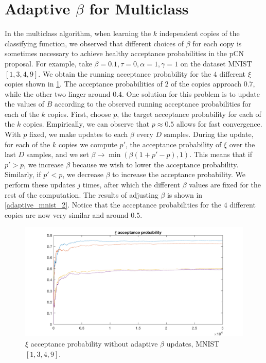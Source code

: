 \documentclass{siamart1116}
\begin{document}

\section{Adaptive $\beta$ for Multiclass}
    In the multiclass algorithm, when learning the $k$ independent copies of the classifying function, we observed that different choices of $\beta$ for each copy is sometimes necessary to achieve healthy acceptance probabilities in the pCN proposal. For example, take $\beta=0.1,\tau=0,\alpha=1,\gamma=1$ on the dataset MNIST $[1,3,4,9]$. We obtain the running acceptance probability for the $4$ different $\xi$ copies shown in \cref{adaptive_mnist_1}. The acceptance probabilities of $2$ of the copies approach $0.7$, while the other two linger around $0.4$. One solution for this problem is to update the values of $B$ according to the observed running acceptance probabilities for each of the $k$ copies. First, choose $p$, the target acceptance probability for each of the $k$ copies. Empirically, we can observe that $p\approx0.5$ allows for fast convergence. With $p$ fixed, we make updates to each $\beta$ every $D$ samples. During the update, for each of the $k$ copies we compute $p'$, the acceptance probability of $\xi$ over the last $D$ samples, and we set $\beta \to \min(\beta(1+p'-p),1)$. This means that if $p'>p$, we increase $\beta$ because we wish to lower the acceptance probability. Similarly, if $p'<p$, we decrease $\beta$ to increase the acceptance probability. We perform these updates $j$ times, after which the different $\beta$ values are fixed for the rest of the computation. The results of adjusting $\beta$ is shown in \cref{adaptive_mnist_2}. Notice that the acceptance probabilities for the $4$ different copies are now very similar and around $0.5$.

    \begin{figure}[!htb]
        \centering
        \caption{\label{adaptive_mnist_1}$\xi$ acceptance probability without adaptive $\beta$ updates, MNIST $[1,3, 4, 9]$.}
        \includegraphics[width=0.8\linewidth]{adaptive_B/without/xi_accept.png}
    \end{figure}
\end{document}

